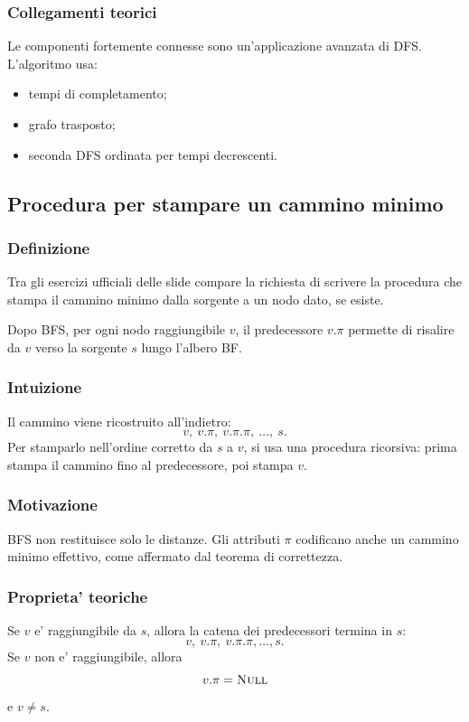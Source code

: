 \subsubsection{Collegamenti teorici}
Le componenti fortemente connesse sono un'applicazione avanzata di DFS. L'algoritmo usa:
\begin{itemize}
	\item tempi di completamento;
	\item grafo trasposto;
	\item seconda DFS ordinata per tempi decrescenti.
\end{itemize}

\subsection{Procedura per stampare un cammino minimo}

\subsubsection{Definizione}
Tra gli esercizi ufficiali delle slide compare la richiesta di scrivere la procedura che stampa il cammino minimo dalla sorgente a un nodo dato, se esiste.

Dopo BFS, per ogni nodo raggiungibile $v$, il predecessore $v.\pi$ permette di risalire da $v$ verso la sorgente $s$ lungo l'albero BF.

\subsubsection{Intuizione}
Il cammino viene ricostruito all'indietro:
\[
v,\ v.\pi,\ v.\pi.\pi,\ \ldots,\ s.
\]
Per stamparlo nell'ordine corretto da $s$ a $v$, si usa una procedura ricorsiva: prima stampa il cammino fino al predecessore, poi stampa $v$.

\subsubsection{Motivazione}
BFS non restituisce solo le distanze. Gli attributi $\pi$ codificano anche un cammino minimo effettivo, come affermato dal teorema di correttezza.

\subsubsection{Proprieta' teoriche}
Se $v$ e' raggiungibile da $s$, allora la catena dei predecessori termina in $s$:
\[
v,\ v.\pi,\ v.\pi.\pi,\ldots,s.
\]
Se $v$ non e' raggiungibile, allora
\[
v.\pi=\textsc{Null}
\]
e $v\neq s$.

